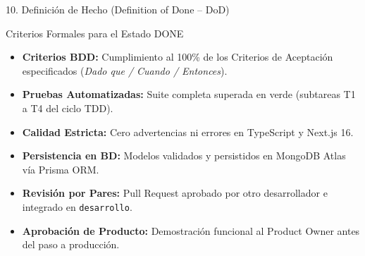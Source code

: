 \documentclass[aspectratio=169, 10pt, spanish]{beamer}
\begin{document}
\begin{frame}{10. Definición de Hecho (Definition of Done -- DoD)}
\begin{center}
\begin{minipage}{0.85\textwidth}
    \begin{academicbox}{Criterios Formales para el Estado DONE}
        \scriptsize
        \begin{itemize}
            \item[\checkmark] \textbf{Criterios BDD:} Cumplimiento al 100\% de los Criterios de Aceptación especificados (\textit{Dado que / Cuando / Entonces}).
            \item[\checkmark] \textbf{Pruebas Automatizadas:} Suite completa superada en verde (subtareas T1 a T4 del ciclo TDD).
            \item[\checkmark] \textbf{Calidad Estricta:} Cero advertencias ni errores en TypeScript y Next.js 16.
            \item[\checkmark] \textbf{Persistencia en BD:} Modelos validados y persistidos en MongoDB Atlas vía Prisma ORM.
            \item[\checkmark] \textbf{Revisión por Pares:} Pull Request aprobado por otro desarrollador e integrado en \texttt{desarrollo}.
            \item[\checkmark] \textbf{Aprobación de Producto:} Demostración funcional al Product Owner antes del paso a producción.
        \end{itemize}
    \end{academicbox}
\end{minipage}
\end{center}
\end{frame}
\end{document}

